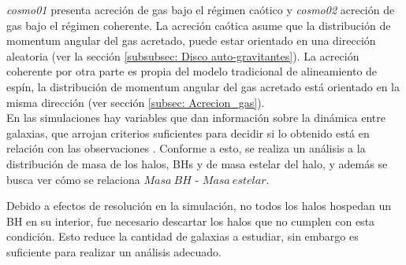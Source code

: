 {\it{cosmo01}} presenta acreción de gas bajo el régimen caótico y {\it{cosmo02}} acreción de gas bajo el régimen coherente. La acreción caótica asume que la distribución de momentum angular del gas acretado, puede estar orientado en una dirección aleatoria  
(ver la sección \ref{subsubsec: Disco auto-gravitantes}). La acreción coherente por otra parte es propia del modelo tradicional de alineamiento de espín, la distribución de momentum angular del gas acretado está orientado en la misma dirección
(ver sección \ref{subsec: Acrecion_gas}).
~\\

En las simulaciones hay variables que dan información sobre la dinámica entre galaxias, que arrojan criterios suficientes para decidir si lo obtenido está en relación con
las observaciones \cite{hutsemekers2014}. 
Conforme a esto, se realiza un análisis a la distribución de masa de los halos, BHs y de masa estelar del halo, y además se busca ver cómo se relaciona $Masa\ BH$ - $Masa\ estelar$.

Debido a efectos de resolución en la simulación, no todos los halos hospedan un BH en su interior, fue necesario descartar los halos que no cumplen con esta condición. Esto reduce  la cantidad de galaxias a estudiar, sin embargo es suficiente para realizar un análisis adecuado.

